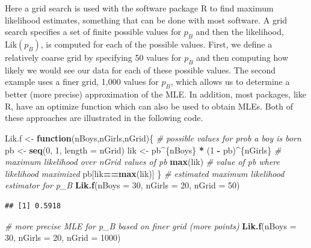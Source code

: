 \documentclass[
]{krantz}
\newenvironment{Shaded}{\begin{snugshade}}{\end{snugshade}}
\newcommand{\CommentTok}[1]{\textcolor[rgb]{0.37,0.37,0.37}{\textit{#1}}}
\newcommand{\ControlFlowTok}[1]{\textcolor[rgb]{0.27,0.27,0.27}{\textbf{#1}}}
\newcommand{\DataTypeTok}[1]{\textcolor[rgb]{0.27,0.27,0.27}{#1}}
\newcommand{\DecValTok}[1]{\textcolor[rgb]{0.06,0.06,0.06}{#1}}
\newcommand{\KeywordTok}[1]{\textcolor[rgb]{0.27,0.27,0.27}{\textbf{#1}}}
\newcommand{\NormalTok}[1]{#1}
\newcommand{\OperatorTok}[1]{\textcolor[rgb]{0.43,0.43,0.43}{\textbf{#1}}}
\newcommand{\StringTok}[1]{\textcolor[rgb]{0.5,0.5,0.5}{#1}}
\newcommand{\Lik}{\mathrm{Lik}}
\begin{document}
Here a grid search is used with the software package R to find maximum likelihood estimates, something that can be done with most software. A grid search specifies a set of finite possible values for \(p_B\) and then the likelihood, \(\Lik(p_B)\), is computed for each of the possible values. First, we define a relatively coarse grid by specifying 50 values for \(p_B\) and then computing how likely we would see our data for each of these possible values. The second example uses a finer grid, 1,000 values for \(p_B\), which allows us to determine a better (more precise) approximation of the MLE. In addition, most packages, like R, have an optimize function which can also be used to obtain MLEs. Both of these approaches are illustrated in the following code.

\begin{Shaded}
\begin{Highlighting}[]
\NormalTok{Lik.f <-}\StringTok{ }\ControlFlowTok{function}\NormalTok{(nBoys,nGirls,nGrid)\{}
    \CommentTok{# possible values for prob a boy is born}
\NormalTok{    pb <-}\StringTok{ }\KeywordTok{seq}\NormalTok{(}\DecValTok{0}\NormalTok{, }\DecValTok{1}\NormalTok{, }\DataTypeTok{length =}\NormalTok{ nGrid)   }
\NormalTok{    lik <-}\StringTok{ }\NormalTok{pb}\OperatorTok{^}\NormalTok{\{nBoys\} }\OperatorTok{*}\StringTok{ }\NormalTok{(}\DecValTok{1} \OperatorTok{-}\StringTok{ }\NormalTok{pb)}\OperatorTok{^}\NormalTok{\{nGirls\}}
    \CommentTok{# maximum likelihood over nGrid values of pb}
    \KeywordTok{max}\NormalTok{(lik)             }
    \CommentTok{# value of pb where likelihood maximized}
\NormalTok{    pb[lik}\OperatorTok{==}\KeywordTok{max}\NormalTok{(lik)]    }
\NormalTok{  \}}
\CommentTok{# estimated maximum likelihood estimator for p_B}
\KeywordTok{Lik.f}\NormalTok{(}\DataTypeTok{nBoys =} \DecValTok{30}\NormalTok{, }\DataTypeTok{nGirls =} \DecValTok{20}\NormalTok{, }\DataTypeTok{nGrid =} \DecValTok{50}\NormalTok{) }
\end{Highlighting}
\end{Shaded}

\begin{verbatim}
## [1] 0.5918
\end{verbatim}

\begin{Shaded}
\begin{Highlighting}[]
\CommentTok{# more precise MLE for p_B based on finer grid (more points)}
\KeywordTok{Lik.f}\NormalTok{(}\DataTypeTok{nBoys =} \DecValTok{30}\NormalTok{, }\DataTypeTok{nGirls =} \DecValTok{20}\NormalTok{, }\DataTypeTok{nGrid =} \DecValTok{1000}\NormalTok{)}
\end{Highlighting}
\end{Shaded}
\end{document}

